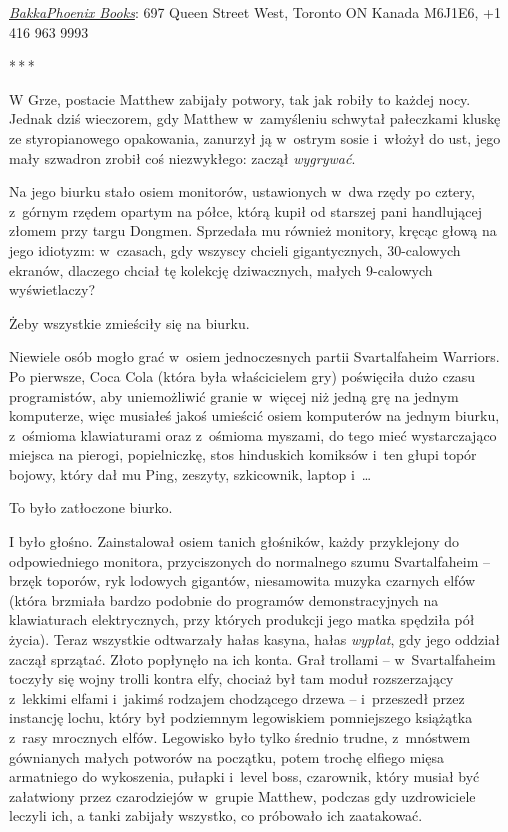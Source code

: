 \documentclass[oneside,polish,11pt,rmheadings]{mwbk}
\newcommand{\threeast}{\par\centerline{*\,*\,*}\medskip\par}
\begin{document}
\href{https://www.bakkaphoenixbooks.com/}{\textit{BakkaPhoenix Books}}: 697 Queen Street West, Toronto ON Kanada M6J1E6, +1 416 963 9993 

\bigskip
\threeast

W Grze, postacie Matthew zabijały potwory, tak jak robiły to każdej nocy. Jednak dziś wieczorem, gdy Matthew w~zamyśleniu schwytał pałeczkami kluskę ze styropianowego opakowania, zanurzył ją w~ostrym sosie i~włożył do ust, jego mały szwadron zrobił coś niezwykłego: zaczął \textit{wygrywać}. 


Na jego biurku stało osiem monitorów, ustawionych w~dwa rzędy po cztery, z~górnym rzędem opartym na półce, którą kupił od starszej pani handlującej złomem przy targu Dongmen. Sprzedała mu również monitory, kręcąc głową na jego idiotyzm: w~czasach, gdy wszyscy chcieli gigantycznych, 30-calowych ekranów, dlaczego chciał tę kolekcję dziwacznych, małych 9-calowych wyświetlaczy? 


Żeby wszystkie zmieściły się na biurku.


Niewiele osób mogło grać w~osiem jednoczesnych partii Svartalfaheim Warriors. Po pierwsze, Coca Cola (która była właścicielem gry) poświęciła dużo czasu programistów, aby uniemożliwić granie w~więcej niż jedną grę na jednym komputerze, więc musiałeś jakoś umieścić osiem komputerów na jednym biurku, z~ośmioma klawiaturami oraz z~ośmioma myszami, do tego mieć wystarczająco miejsca na pierogi, popielniczkę, stos hinduskich komiksów i~ten głupi topór bojowy, który dał mu Ping, zeszyty, szkicownik, laptop i~\ldots  


To było zatłoczone biurko. 


I było głośno. Zainstalował osiem tanich głośników, każdy przyklejony do odpowiedniego monitora, przyciszonych do normalnego szumu Svartalfaheim -- brzęk toporów, ryk lodowych gigantów, niesamowita muzyka czarnych elfów (która brzmiała bardzo podobnie do programów demonstracyjnych na klawiaturach elektrycznych, przy których produkcji jego matka spędziła pół życia). Teraz wszystkie odtwarzały hałas kasyna, hałas \textit{wypłat}, gdy jego oddział zaczął sprzątać. Złoto popłynęło na ich konta. Grał trollami -- w~Svartalfaheim toczyły się wojny trolli kontra elfy, chociaż był tam moduł rozszerzający z~lekkimi elfami i~jakimś rodzajem chodzącego drzewa -- i~przeszedł przez instancję lochu, który był podziemnym legowiskiem pomniejszego książątka z~rasy mrocznych elfów. Legowisko było tylko średnio trudne, z~mnóstwem gównianych małych potworów na początku, potem trochę elfiego mięsa armatniego do wykoszenia, pułapki i~level boss, czarownik, który musiał być załatwiony przez czarodziejów w~grupie Matthew, podczas gdy uzdrowiciele leczyli ich, a tanki zabijały wszystko, co próbowało ich zaatakować. 
\end{document}
